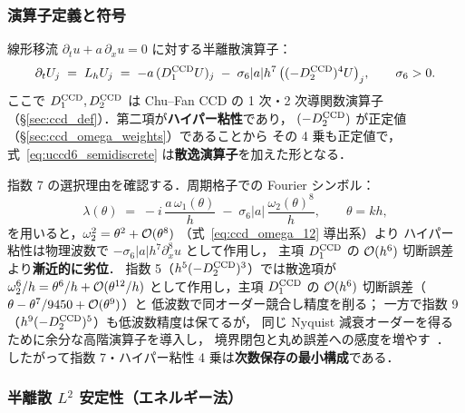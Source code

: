 \subsubsection{演算子定義と符号}
\label{sec:uccd6_hyperviscosity}

線形移流 $\partial_t u + a\,\partial_x u = 0$ に対する半離散演算子：
\begin{equation}
  \partial_t U_j
  \;=\; L_h U_j
  \;=\; -a\,(D_1^{\mathrm{CCD}}U)_j \;-\; \sigma_6|a|h^{7}\,\bigl((-D_2^{\mathrm{CCD}})^{4}U\bigr)_j,
  \qquad \sigma_6 > 0.
  \label{eq:uccd6_semidiscrete}
\end{equation}
ここで $D_1^{\mathrm{CCD}}, D_2^{\mathrm{CCD}}$ は Chu--Fan CCD の 1 次・2 次導関数演算子
（§\ref{sec:ccd_def}）．第二項が\textbf{ハイパー粘性}であり，
$(-D_2^{\mathrm{CCD}})$ が正定値（§\ref{sec:ccd_omega_weights}）であることから
その 4 乗も正定値で，式~\eqref{eq:uccd6_semidiscrete} は\textbf{散逸演算子}を加えた形となる．

指数 7 の選択理由を確認する．周期格子での Fourier シンボル：
\begin{equation}
  \lambda(\theta)
  \;=\; -i\,\frac{a\,\omega_1(\theta)}{h}
  \;-\; \sigma_6|a|\,\frac{\omega_2(\theta)^{8}}{h},
  \qquad \theta = kh,
  \label{eq:uccd6_symbol}
\end{equation}
を用いると，$\omega_2^2 = \theta^2 + \mathcal{O}(\theta^8)$
（式~\eqref{eq:ccd_omega_12} 導出系）より
ハイパー粘性は物理波数で
$-\sigma_6|a|h^{7}\partial_x^{8}u$ として作用し，
主項 $D_1^{\mathrm{CCD}}$ の $\mathcal{O}(h^6)$ 切断誤差より\textbf{漸近的に劣位}．
指数 5（$h^{5}(-D_2^{\mathrm{CCD}})^3$）では散逸項が $\omega_2^6/h = \theta^6/h + \mathcal{O}(\theta^{12}/h)$
として作用し，主項 $D_1^{\mathrm{CCD}}$ の $\mathcal{O}(h^6)$ 切断誤差（$\theta - \theta^7/9450 + \mathcal{O}(\theta^9)$）と
低波数で同オーダー競合し精度を削る；
一方で指数 9（$h^{9}(-D_2^{\mathrm{CCD}})^5$）も低波数精度は保てるが，
同じ Nyquist 減衰オーダーを得るために余分な高階演算子を導入し，
境界閉包と丸め誤差への感度を増やす~\cite{Carpenter1994}．
したがって指数 7・ハイパー粘性 4 乗は\textbf{次数保存の最小構成}である．

\subsubsection{半離散 \texorpdfstring{$L^2$}{L2} 安定性（エネルギー法）}
\label{sec:uccd6_l2_stability}

